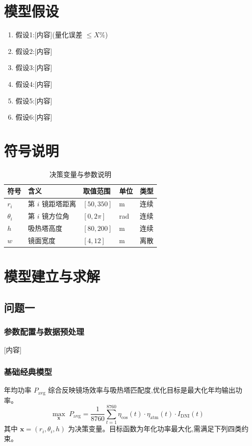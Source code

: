 \documentclass[12pt,a4paper]{ctexart}
\begin{document}
\section{模型假设}
\begin{enumerate}
  \item 假设1:[内容](量化误差 $\leq X\%$)
  \item 假设2:[内容]
  \item 假设3:[内容]
  \item 假设4:[内容]
  \item 假设5:[内容]
  \item 假设6:[内容]
\end{enumerate}

\section{符号说明}
\begin{table}[H]
\centering
\caption{决策变量与参数说明}
\label{tab:symbols}
\begin{tabular}{lllll}
\toprule
符号 & 含义 & 取值范围 & 单位 & 类型 \\
\midrule
$r_i$ & 第 $i$ 镜距塔距离 & $[50, 350]$ & m & 连续 \\
$\theta_i$ & 第 $i$ 镜方位角 & $[0, 2\pi]$ & rad & 连续 \\
$h$ & 吸热塔高度 & $[80, 200]$ & m & 连续 \\
$w$ & 镜面宽度 & $[4, 12]$ & m & 离散 \\
\bottomrule
\end{tabular}
\end{table}

\section{模型建立与求解}

\subsection{问题一}

\subsubsection{参数配置与数据预处理}
[内容]

\subsubsection{基础经典模型}
年均功率 $P_{\text{avg}}$ 综合反映镜场效率与吸热塔匹配度,优化目标是最大化年均输出功率。
\begin{equation}
\max_{\mathbf{x}} \; P_{\text{avg}} = \frac{1}{8760} \sum_{t=1}^{8760} \eta_{\cos}(t) \cdot \eta_{\text{atm}}(t) \cdot I_{\text{DNI}}(t)
\label{eq:obj}
\end{equation}
其中 $\mathbf{x} = (r_i, \theta_i, h)$ 为决策变量。目标函数为年化功率最大化,需满足下列四类约束。
\end{document}
